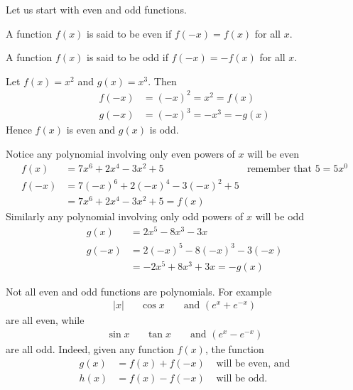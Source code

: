 Let us start with even and odd functions.
\begin{defn}\label{def:APPeven} %
A function $f(x)$ is said to be even if $f(-x)=f(x)$ for all $x$.
\end{defn}
\begin{defn}\label{def:APPodd} %
A function $f(x)$ is said to be odd if $f(-x)=-f(x)$ for all $x$.
\end{defn}
\begin{eg}\label{eg_3_6_3}
  Let $f(x) = x^2$ and $g(x)=x^3$. Then
\begin{align*}
  f(-x) &= (-x)^2 = x^2 = f(x) \\
  g(-x) &= (-x)^3 = -x^3 = -g(x)
\end{align*}
Hence $f(x)$ is even and $g(x)$ is odd.

Notice any polynomial involving only even powers of $x$ will be even
\begin{align*}
  f(x) &= 7x^6+2x^4-3x^2+5 & \text{remember that $5=5x^0$} \\
  f(-x) &= 7(-x)^6+2(-x)^4-3(-x)^2+5 \\
  &= 7x^6+2x^4-3x^2+5  = f(x)
\end{align*}
Similarly any polynomial involving only odd powers of $x$ will be odd
\begin{align*}
  g(x) &= 2x^5-8x^3-3x \\
  g(-x) &= 2(-x)^5-8(-x)^3-3(-x) \\
  &= -2x^5+8x^3+3x  = -g(x)
\end{align*}
\end{eg}
Not all even and odd functions are polynomials. For example
\begin{align*}
  |x| && \cos x && \text{ and } (e^x + e^{-x})
\end{align*}
are all even, while
\begin{align*}
  \sin x && \tan x && \text{ and } (e^x-e^{-x})
\end{align*}
are all odd. Indeed, given any function $f(x)$, the function
\begin{align*}
  g(x) &= f(x)+f(-x) & \text{ will be even, and}\\
  h(x) &= f(x)-f(-x) & \text{ will be odd.}
\end{align*}


